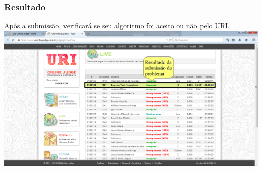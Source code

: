\begin{frame}
 \frametitle{Resultado}
 Após a submissão, verificará se seu algoritmo foi aceito ou não pelo URI.
 \includegraphics[scale=.28]{uri/Imagens/09Resultado.png}
\end{frame}